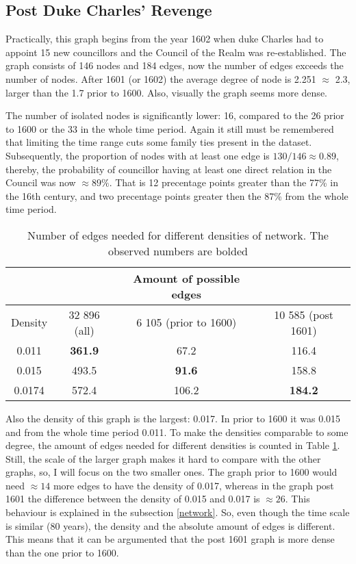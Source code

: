\subsection{Post Duke Charles' Revenge}
Practically, this graph begins from the year 1602 when duke Charles had to appoint 15 new councillors and the Council of the Realm was re-established. The graph consists of 146 nodes and 184 edges, now the number of edges exceeds the number of nodes. After 1601 (or 1602) the average degree of node is 2.251 $\approx$ 2.3, larger than the 1.7 prior to 1600. Also, visually the graph seems more dense. 

The number of isolated nodes is significantly lower: 16, compared to the 26 prior to 1600 or the 33 in the whole time period. Again it still must be remembered that limiting the time range cuts some family ties present in the dataset. Subsequently, the proportion of nodes with at least one edge is $130/146 \approx 0.89$, thereby, the probability of councillor having at least one direct relation in the Council was now $\approx 89\%$. That is 12 precentage points greater than the 77\% in the 16th century, and two precentage points greater then the 87\% from the whole time period.

\begin{table}
	\caption[Number of edges needed for different densities of network]{Number of edges needed for different densities of network. The observed numbers are bolded}
	\label{edges}
	\begin{tabular}{cccc}
		\hline
		&& Amount of possible edges & \\
		\hline
		Density & 32 896 (all) & 6 105 (prior to 1600) & 10 585 (post 1601) \\
		\hline 
		0.011 & \textbf{361.9} & 67.2 & 116.4 \\
		\hline
		0.015 & 493.5 & \textbf{91.6} & 158.8 \\
		\hline
		0.0174 & 572.4 & 106.2 & \textbf{184.2}\\
		\hline
	\end{tabular}
\end{table}

Also the density of this graph is the largest: 0.017. In prior to 1600 it was 0.015 and from the whole time period 0.011. To make the densities comparable to some degree, the amount of edges needed for different densities is counted in Table \ref{edges}. Still, the scale of the larger graph makes it hard to compare with the other graphs, so, I will focus on the two smaller ones. The graph prior to 1600 would need $\approx 14$ more edges to have the density of 0.017, whereas in the graph post 1601 the difference between the density of 0.015 and 0.017 is $\approx 26$. This behaviour is explained in the subsection \ref{network}. So, even though the time scale is similar (80 years), the density and the absolute amount of edges is different. This means that it can be argumented that the post 1601 graph is more dense than the one prior to 1600. 
 
